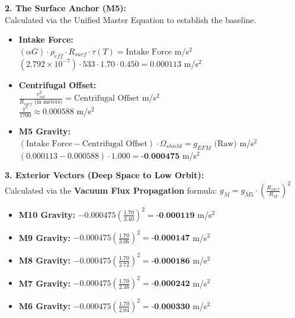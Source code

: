 \documentclass[11pt, a4paper]{article}
\begin{document}
  \vspace{1.0em}
  \noindent \textbf{2. The Surface Anchor (M5):} \\
  \hspace*{1em} Calculated via the Unified Master Equation to establish the baseline.
  \begin{itemize}
    \item \textbf{Intake Force:} \\[0.5em]
    \hspace*{2em} $(\alpha G) \cdot \rho_{eff} \cdot R_{surf} \cdot \tau(T) = \text{Intake Force}$ m/s$^2$ \\[1em]
    \hspace*{2em} $(2.792 \times 10^{-7}) \cdot 533 \cdot 1.70 \cdot 0.450 = 0.000113$ m/s$^2$
    
    \item \textbf{Centrifugal Offset:} \\[0.5em]
    \hspace*{2em} $\frac{v_{rot}^2}{R_{surf} \text{ (in meters)}} = \text{Centrifugal Offset}$ m/s$^2$ \\[1em]
    \hspace*{2em} $\frac{1^2}{1700} \approx 0.000588$ m/s$^2$
    
    \item \textbf{M5 Gravity:} \\[0.5em]
    \hspace*{2em} $(\text{Intake Force} - \text{Centrifugal Offset}) \cdot \Omega_{shield} = g_{EFM} \text{ (Raw)}$ m/s$^2$ \\[1em]
    \hspace*{2em} $(0.000113 - 0.000588) \cdot 1.000 = \textbf{-0.000475}$ m/s$^2$
  \end{itemize}

  \clearpage
  \noindent \textbf{3. Exterior Vectors (Deep Space to Low Orbit):} \\
  \hspace*{1em} Calculated via the \textbf{Vacuum Flux Propagation} formula: $g_M = g_{M5} \cdot \left( \frac{R_{surf}}{R_M} \right)^2$
  \begin{itemize}
    \item \textbf{M10 Gravity:} $-0.000475 \left( \frac{1.70}{3.40} \right)^2 = \textbf{-0.000119}$ m/s$^2$
    \item \textbf{M9 Gravity:} $-0.000475 \left( \frac{1.70}{3.06} \right)^2 = \textbf{-0.000147}$ m/s$^2$
    \item \textbf{M8 Gravity:} $-0.000475 \left( \frac{1.70}{2.72} \right)^2 = \textbf{-0.000186}$ m/s$^2$
    \item \textbf{M7 Gravity:} $-0.000475 \left( \frac{1.70}{2.38} \right)^2 = \textbf{-0.000242}$ m/s$^2$
    \item \textbf{M6 Gravity:} $-0.000475 \left( \frac{1.70}{2.04} \right)^2 = \textbf{-0.000330}$ m/s$^2$
  \end{itemize}
\end{document}
